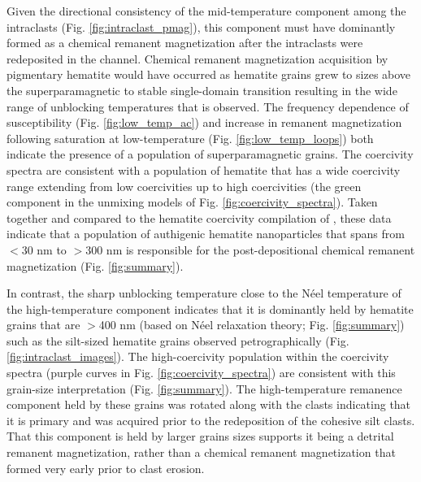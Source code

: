 \documentclass[draft]{agujournal2018}
\begin{document}
Given the directional consistency of the mid-temperature component among the intraclasts (Fig. \ref{fig:intraclast_pmag}), this component must have dominantly formed as a chemical remanent magnetization after the intraclasts were redeposited in the channel. Chemical remanent magnetization acquisition by pigmentary hematite would have occurred as hematite grains grew to sizes above the superparamagnetic to stable single-domain transition resulting in the wide range of unblocking temperatures that is observed. The frequency dependence of susceptibility (Fig. \ref{fig:low_temp_ac}) and increase in remanent magnetization following saturation at low-temperature (Fig. \ref{fig:low_temp_loops}) both indicate the presence of a population of superparamagnetic grains. The coercivity spectra are consistent with a population of hematite that has a wide coercivity range extending from low coercivities up to high coercivities (the green component in the unmixing models of Fig. \ref{fig:coercivity_spectra}). Taken together and compared to the hematite coercivity compilation of \cite{Ozdemir2014a}, these data indicate that a population of authigenic hematite nanoparticles that spans from $<$30 nm to $>$300 nm is responsible for the post-depositional chemical remanent magnetization (Fig. \ref{fig:summary}). 

In contrast, the sharp unblocking temperature close to the N\'eel temperature of the high-temperature component indicates that it is dominantly held by hematite grains that are $>$400 nm (based on N\'eel relaxation theory; Fig. \ref{fig:summary}) such as the silt-sized hematite grains observed petrographically (Fig. \ref{fig:intraclast_images}). The high-coercivity population within the coercivity spectra (purple curves in Fig. \ref{fig:coercivity_spectra}) are consistent with this grain-size interpretation (Fig. \ref{fig:summary}). The high-temperature remanence component held by these grains was rotated along with the clasts indicating that it is primary and was acquired prior to the redeposition of the cohesive silt clasts. That this component is held by larger grains sizes supports it being a detrital remanent magnetization, rather than a chemical remanent magnetization that formed very early prior to clast erosion. 
\end{document}
